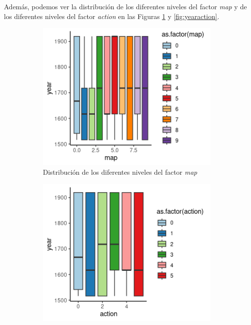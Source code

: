 Además, podemos ver la distribución de los diferentes niveles del factor \emph{map} y de los diferentes niveles del factor \emph{action} en las Figuras \ref{fig:yearmap} y \ref{fig:yearaction}.

\begin{figure}[!tbp]
  \begin{subfigure}[b]{0.49\textwidth}
    \includegraphics[width=\textwidth, height=\textwidth]{imagenes/Rplot.png}
    \caption{Distribución de los diferentes niveles del factor \emph{map}}
    \label{fig:yearmap}
  \end{subfigure}
  \hfill
  \begin{subfigure}[b]{0.49\textwidth}
    \includegraphics[width=\textwidth, height=\textwidth]{imagenes/Rplot01.png}

\end{subfigure}
\end{figure}
